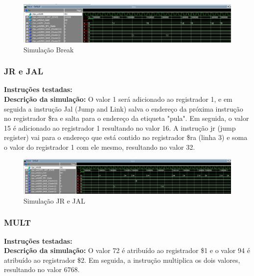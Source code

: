 \begin{figure}[htbp!]
\centering
\includegraphics[width=1\textwidth]{figure/simulacao_break.png}
\caption{Simulação Break} 
\label{fig:imagem_massa}
\end{figure}

\newpage

\subsubsection{JR e JAL}
\textbf{Instruções testadas:}
 \\

\textbf{Descrição da simulação:} O valor 1 será adicionado ao registrador 1, e em seguida a instrução Jal (Jump and Link) salva o endereço da próxima instrução no registrador \$ra e salta para o endereço da etiqueta "pula". Em seguida, o valor 15 é adicionado ao registrador 1 resultando no valor 16. A instrução jr (jump register) vai para o endereço que está contido no registrador \$ra (linha 3) e soma o valor do registrador 1 com ele mesmo, resultando no valor 32. \\

\begin{figure}[htbp!]
\centering
\includegraphics[width=1\textwidth]{figure/simulacao_jr_jal.png}
\caption{Simulação JR e JAL} 
\label{fig:imagem_massa}
\end{figure}

\subsubsection{MULT}
\textbf{Instruções testadas:}
 \\

\textbf{Descrição da simulação:} O valor 72 é atribuído ao registrador \$1 e o valor 94 é atribuído ao registrador \$2. Em seguida, a instrução multiplica os dois valores, resultando no valor 6768. \\

